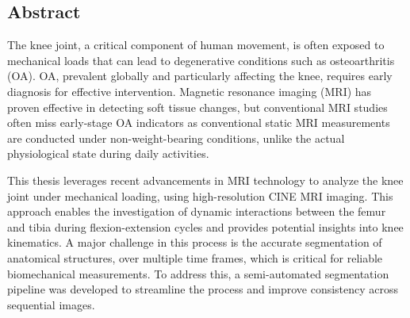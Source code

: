 \documentclass{micro-econ-thesis}
\begin{document}
\thesisDate{\today}
\thesisCompany{}

\thesisMakeTitle

\cleardoublepage
{}
\pagestyle{plain}
\subsection*{Abstract}

The knee joint, a critical component of human movement, is often exposed to mechanical loads that can lead to degenerative conditions such as osteoarthritis (OA). OA, prevalent globally and particularly affecting the knee, requires early diagnosis for effective intervention. Magnetic resonance imaging (MRI) has proven effective in detecting soft tissue changes, but conventional MRI studies often miss early-stage OA indicators as conventional static MRI measurements are conducted under non-weight-bearing conditions, unlike the actual physiological state during daily activities.

This thesis leverages recent advancements in MRI technology to analyze the knee joint under mechanical loading, using high-resolution CINE MRI imaging. This approach enables the investigation of dynamic interactions between the femur and tibia during flexion-extension cycles and provides potential insights into knee kinematics. A major challenge in this process is the accurate segmentation of anatomical structures, over multiple time frames, which is critical for reliable biomechanical measurements. To address this, a semi-automated segmentation pipeline was developed to streamline the process and improve consistency across sequential images.
\end{document}
